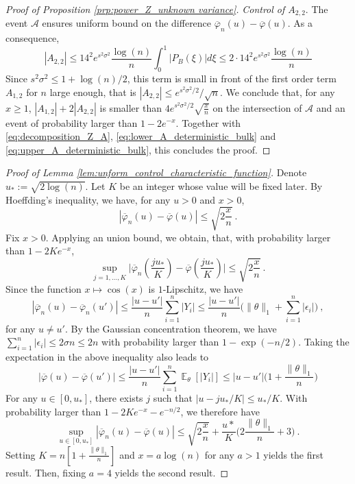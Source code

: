 \documentclass[twoside,11pt]{article}
\def\beq{\begin{equation}}
\def\eeq{\end{equation}}
\def\cA{\mathcal{A}}
\newcommand{\E}{\operatorname{\mathbb{E}}}
\newcommand{\<}{\langle}
\renewcommand{\>}{\rangle}
\begin{document}
\begin{proof}[Proof of Proposition \ref{prp:power_Z_unknown variance}]
\bigskip 

\noindent 
{\it Control of $A_{2,2}$}. The event $\cA$ ensures uniform bound on the difference $\overline{\varphi}_n(u)- \overline{\varphi}(u)$. As a consequence, 
\[
|A_{2,2}|\leq 14^2 e^{s^2\sigma^2}\frac{\log(n)}{n}  \int_{0}^{1} |P_B(\xi)|d\xi\leq 2\cdot 14^2 e^{s^2\sigma^2}\frac{\log(n)}{n} 
\]
Since $s^2\sigma^2\leq 1+ \log(n)/2$, this term is small in front of the first order term $A_{1,2}$ for $n$ large enough, that is 
$|A_{2,2}|\leq e^{s^2 \sigma^2/2}/\sqrt{n}$.
We conclude that, for any $x \geq 1$,  $|A_{1,2}|+2|A_{2,2}|$ is smaller than $4e^{s^2 \sigma^2/2} \sqrt{\tfrac{x}{n}}$ on the intersection of $\cA$ and an event of probability larger than $1-2e^{-x}$.
Together with \eqref{eq:decomposition_Z_A}, \eqref{eq:lower_A_deterministic_bulk} and \eqref{eq:upper_A_deterministic_bulk}, this concludes the proof.

\end{proof}


\begin{proof}[Proof of Lemma \ref{lem:unform_control_characteristic_function}]
Denote $u_{*}:=\sqrt{2\log(n)}$. Let $K$ be an integer whose value will be fixed later. By Hoeffding's inequality, we have, for any $u>0$ and $x>0$,
\[
 |\overline{\varphi}_n(u) - \overline{\varphi}(u)| \leq \sqrt{2\frac{x}{n}}\ .
\]
Fix $x>0$. Applying an union bound, we obtain, that, with probability larger than $1-2Ke^{-x}$,
\beq\label{eq:concent1}
\sup_{j=1,\ldots, K}\big|\overline{\varphi}_n(\frac{ju_*}{K}) - \overline{\varphi}(\frac{ju_*}{K})\big| \leq \sqrt{2\frac{x}{n}}\ .
\eeq
Since the function $x\mapsto \cos(x)$ is $1$-Lipschitz, we have
\[
 |\overline{\varphi}_n(u)  - \overline{\varphi}_n(u')|\leq \frac{|u-u'|}{n}\sum_{i=1}^n |Y_i|\leq \frac{|u-u'|}{n}\big(\|\theta\|_1 +\sum_{i=1}^n|\epsilon_i|\big)\ ,
\]
for any $u\neq u'$.
By the Gaussian concentration theorem, we have $\sum_{i=1}^n|\epsilon_i|\leq 2\sigma n\leq 2n$ with probability larger than $1-\exp(-n/2)$. Taking the expectation in the above inequality also leads to
\[
 |\overline{\varphi}(u)  - \overline{\varphi}(u')|\leq \frac{|u-u'|}{n}\sum_{i=1}^n \E_{\theta}[|Y_i|]\leq |u-u'|\big(1+ \frac{\|\theta\|_1}{n}\big)
\]
For any $u\in [0,u_*]$, there exists $j$ such that $|u-ju_*/K|\leq u_*/K$. With probability larger than $1-2Ke^{-x}-e^{-n/2}$, we therefore have
\[
 \sup_{u\in[0,u_*]}|\overline{\varphi}_n(u) - \overline{\varphi}(u)|\leq \sqrt{2\frac{x}{n}}+ \frac{u*}{K}\big(2\frac{\|\theta\|_1}{n}+3\big)\ .
\]
Setting $K= n [1+ \frac{\|\theta\|_1}{n}]$ and $x= a\log(n)$ for any $a>1$ yields the first result. Then, fixing $a=4$ yields the second result.



\end{proof}
\end{document}
